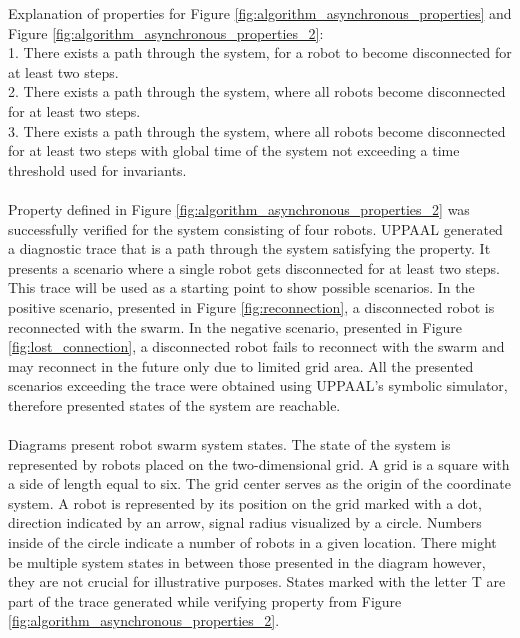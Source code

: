 \noindent
Explanation of properties for Figure \ref{fig:algorithm_asynchronous_properties} and Figure \ref{fig:algorithm_asynchronous_properties_2}:\\
1. There exists a path through the system, for a robot to become disconnected for at least two steps.\\
2. There exists a path through the system, where all robots become disconnected for at least two steps.\\
3. There exists a path through the system, where all robots become disconnected for at least two steps with global time of the system not exceeding a time threshold used for invariants.\\
\\
Property defined in Figure \ref{fig:algorithm_asynchronous_properties_2} was successfully verified for the system consisting of four robots. UPPAAL generated a diagnostic trace that is a path through the system satisfying the property. It presents a scenario where a single robot gets disconnected for at least two steps. This trace will be used as a starting point to show possible scenarios. In the positive scenario, presented in Figure \ref{fig:reconnection}, a disconnected robot is reconnected with the swarm. In the negative scenario, presented in Figure \ref{fig:lost_connection}, a disconnected robot fails to reconnect with the swarm and may reconnect in the future only due to limited grid area. All the presented scenarios exceeding the trace were obtained using UPPAAL's symbolic simulator, therefore presented states of the system are reachable.\\
\\
Diagrams present robot swarm system states. The state of the system is represented by robots placed on the two-dimensional grid. A grid is a square with a side of length equal to six. The grid center serves as the origin of the coordinate system. A robot is represented by its position on the grid marked with a dot, direction indicated by an arrow, signal radius visualized by a circle. Numbers inside of the circle indicate a number of robots in a given location. There might be multiple system states in between those presented in the diagram however, they are not crucial for illustrative purposes. States marked with the letter T are part of the trace generated while verifying property from Figure \ref{fig:algorithm_asynchronous_properties_2}.
\newpage
\noindent
